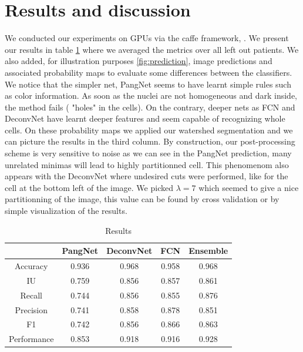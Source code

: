 \documentclass{article}
\begin{document}
\section{Results and discussion}
\label{sec:result}
\noindent We conducted our experiments on GPUs via the caffe framework, 
\cite{jia2014caffe}. We present our results in table \ref{tab:res} where 
we averaged the metrics over all left out patients. We also added, for 
illustration purposes \ref{fig:prediction}, image predictions and 
associated 
probability maps to evaluate some differences between the classifiers. 
We notice that the simpler net, PangNet seems to have learnt simple 
rules such as color information. As soon as the nuclei are not
homogeneous and dark inside, the method fails ( "holes" in the
cells). On the 
contrary, deeper nets as FCN and DeconvNet have learnt deeper features 
and seem capable of recognizing whole cells. On these probability maps 
we applied our watershed segmentation and we can picture the results in 
the third 
column. By construction, our post-processing 
scheme is very sensitive to noise as we can see in the PangNet 
prediction, many unrelated minimas will lead to highly partitionned cell. 
This phenomenom also appears with the DeconvNet where undesired 
cuts were performed, like for the cell at the bottom left of the image. 
We picked $\lambda = 7$ which seemed to give a nice partitionning of 
the image, this value can be found by cross validation or by simple 
visualization of the results.
\begin{table}
\begin{tabular}{|c|c|c|c|c|}
\hline
  & PangNet & DeconvNet & FCN & Ensemble\\
 \hline
Accuracy  &       0.936 & 0.968 &0.958 & 0.968  \\
IU   &    0.759 &     0.856 & 0.857 & 0.861 \\
Recall     &       0.744  &     0.856 & 0.855 & 0.876\\
Precision   &       0.741 &     0.858 & 0.878 & 0.851\\
F1    &       0.742 &     0.856 & 0.866  & 0.863\\
Performance    &       0.853 &     0.918 & 0.916 & 0.928\\
\hline
\end{tabular}
\caption{Results}
\label{tab:res}
\end{table}
\end{document}
